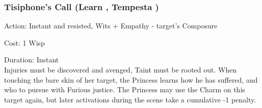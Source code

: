 \subsubsection*{Tisiphone's Call (Learn \textbullet\textbullet, Tempesta \textbullet)}

\noindent Action: Instant and resisted, Wits + Empathy - target's Composure

\noindent Cost: 1 Wisp

\noindent Duration: Instant\\

Injuries must be discovered and avenged, Taint must be rooted out. When touching the bare skin of her target, the Princess learns how he has suffered, and who to pursue with Furious justice. The Princess may use the Charm on this target again, but later activations during the scene take a cumulative -1 penalty.

